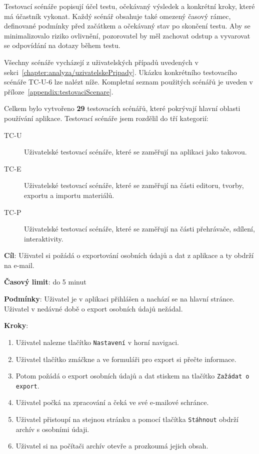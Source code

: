 Testovací scénáře popisují účel testu, očekávaný výsledek a konkrétní kroky, které má účastník vykonat.
Každý scénář obsahuje také omezený časový rámec, definované podmínky před začátkem a očekávaný stav po skončení testu. 
Aby se minimalizovalo riziko ovlivnění, pozorovatel by měl zachovat odstup a vyvarovat se odpovídání na dotazy během testu.

Všechny scénáře vycházejí z uživatelských případů uvedených v sekci~\ref{chapter:analyza/uzivatelskePripady}.
Ukázku konkrétního testovacího scénáře TC-U-6 lze nalézt níže. 
Kompletní seznam použitých scénářů je uveden v příloze~\ref{appendix:testovaciScenare}.

Celkem bylo vytvořeno \textbf{29} testovacích scénářů, které pokrývají hlavní oblasti používání aplikace.
Testovací scénáře jsem rozdělil do tří kategorií:

\begin{description}
    \item[TC-U] Uživatelské testovací scénáře, které se zaměřují na aplikaci jako takovou. 
    \item[TC-E] Uživatelské testovací scénáře, které se zaměřují na části editoru, tvorby, exportu a importu materiálů.
    \item[TC-P] Uživatelské testovací scénáře, které se zaměřují na části přehrávače, sdílení, interaktivity.
\end{description}


\vspace{1em}

\textbf{Cíl}: Uživatel si požádá o exportování osobních údajů a dat z aplikace a ty obdrží na e-mail.

\textbf{Časový limit}: do 5 minut

\textbf{Podmínky}: Uživatel je v aplikaci přihlášen a nachází se na hlavní stránce. Uživatel v nedávné době o export osobních údajů nežádal.

\textbf{Kroky}:

\begin{enumerate}[leftmargin=1.4cm]
    \item Uživatel nalezne tlačítko \verb|Nastavení| v horní navigaci.
    \item Uživatel tlačítko zmáčkne a ve formuláři pro export si přečte informace.
    \item Potom požádá o export osobních údajů a dat stiskem na tlačítko \verb|Zažádat o export|.
    \item Uživatel počká na zpracování a čeká ve své e-mailové schránce.
    \item Uživatel přistoupí na stejnou stránku a pomocí tlačítka \verb|Stáhnout| obdrží archív s osobními údaji.
    \item Uživatel si na počítači archív otevře a prozkoumá jejich obsah.
\end{enumerate}

